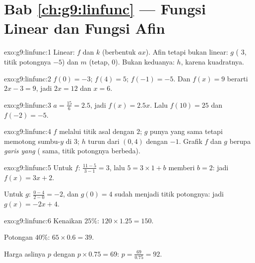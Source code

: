\section*{Bab \ref{ch:g9:linfunc} --- Fungsi Linear dan Fungsi Afin}

\begin{solution}{exo:g9:linfunc:1}
Linear: $f$ dan $k$ (berbentuk $ax$). Afin tetapi bukan linear: $g$
( $3$, titik potongnya $-5$) dan $m$ (tetap, 
$0$). Bukan keduanya: $h$, karena kuadratnya.
\end{solution}

\begin{solution}{exo:g9:linfunc:2}
$f(0) = -3$; $f(4) = 5$; $f(-1) = -5$. Dan $f(x) = 9$ berarti
$2x - 3 = 9$, jadi $2x = 12$ dan $x = 6$.
\end{solution}

\begin{solution}{exo:g9:linfunc:3}
$a = \frac{15}{6} = 2.5$, jadi $f(x) = 2.5x$. Lalu $f(10) = 25$ dan
$f(-2) = -5$.
\end{solution}

\begin{solution}{exo:g9:linfunc:4}
$f$ melalui titik asal dengan  $2$; $g$ punya  yang sama
tetapi memotong sumbu-$y$ di $3$; $h$ turun dari $(0, 4)$ dengan
 $-1$. Grafik $f$ dan $g$ berupa \emph{garis yang }
( sama, titik potongnya berbeda).
\end{solution}

\begin{solution}{exo:g9:linfunc:5}
Untuk $f$:  $\frac{11 - 5}{3 - 1} = 3$, lalu
$5 = 3 \times 1 + b$ memberi $b = 2$: jadi $f(x) = 3x + 2$.

Untuk $g$:  $\frac{0 - 4}{2 - 0} = -2$, dan $g(0) = 4$ sudah
menjadi titik potongnya: jadi $g(x) = -2x + 4$.
\end{solution}

\begin{solution}{exo:g9:linfunc:6}
Kenaikan $25\%$: $120 \times 1.25 = 150$.

Potongan $40\%$: $65 \times 0.6 = 39$.

Harga aslinya $p$ dengan $p \times 0.75 = 69$:
$p = \frac{69}{0.75} = 92$.
\end{solution}

